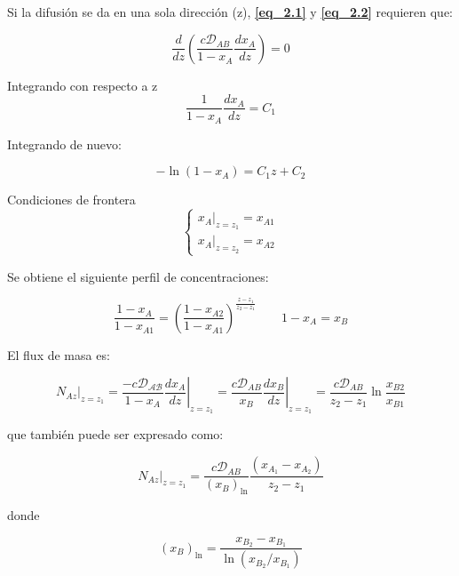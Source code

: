 Si la difusión se da en una sola dirección (z), \textbf{\eqref{eq_2.1}} y \textbf{\eqref{eq_2.2}} requieren que:

\begin{equation}
	\frac{d}{dz} \left( \frac{c \mathscr{D}_{AB}}{1-x_A} \frac{dx_A}{dz} \right) = 0
    \label{eq_2.3}
\end{equation}

Integrando con respecto a z
$$
	\frac{1}{1-x_A} \frac{dx_A}{dz} = C_1
$$

Integrando de nuevo: 

\begin{equation}
- \ln{(1-x_A)} = C_1 z +C_2
\label{eq_2.4}
\end{equation}

Condiciones de frontera 
\begin{equation}
	\left\{
	\begin{aligned}
	x_A |_{z=z_1} = x_{A1} \\
	x_A |_{z=z_2} = x_{A2}
	\end{aligned}
	\right.
    \label{eq_2.5}
\end{equation}

Se obtiene el siguiente perfil de concentraciones:

\begin{equation}
	\frac{1-x_A}{1-x_{A1}} = \left( \frac{1-x_{A2}}{1-x_{A1}} \right)^{\frac{z-z_1}{z_2-z_1}} 
	\qquad 
	1-x_A = x_B
    \label{eq_2.6}
\end{equation}

El flux de masa es:

\begin{equation}
N_{Az} |_{z=z_1} = \left. \frac{ - c \mathcal{\mathscr{D}_{AB}}}{1-x_A} \frac{dx_A}{dz} \right|_{z=z_1} = \left. \frac{c \mathscr{D}_{AB}}{x_B} \frac{dx_B}{dz} \right|_{z=z_1} =  \frac{c \mathscr{D}_{AB}}{z_2 - z_1} \ln{\frac{x_{B2}}{x_{B1}}}
\label{eq_2.7}
\end{equation}

que también puede ser expresado como: 

\begin{equation}
	N_{Az}|_{z=z_1} = \frac{c \mathscr{D}_{AB}}{(x_B)_{\ln{}}} \frac{(x_{A_1} - x_{A_2})}{z_2 - z_1}
    \label{eq_2.8}
\end{equation}

donde 

\begin{equation}
(x_B)_{\ln{}} = \frac{x_{B_2} - x_{B_1}}{\ln{(x_{B_2}/x_{B_1})}}
\label{eq_2.9}
\end{equation}

